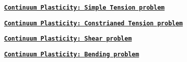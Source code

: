 \href{example_cp_simpleTension.pdf}{\tt {\bfseries Continuum Plasticity\-: Simple Tension problem}} \par
 \href{example_cp_constrainedTension.pdf}{\tt {\bfseries Continuum Plasticity\-: Constrianed Tension problem}} \par
 \href{example_cp_shear.pdf}{\tt {\bfseries Continuum Plasticity\-: Shear problem}} \par
 \href{example_cp_bending.pdf}{\tt {\bfseries Continuum Plasticity\-: Bending problem}} \par
 